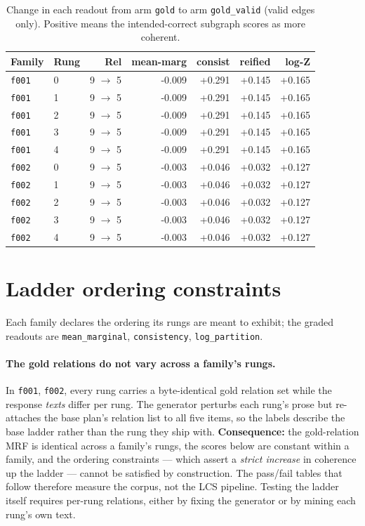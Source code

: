 \documentclass[11pt]{article}
\begin{document}
\begin{table}[htbp]
\centering
\small
\caption{Change in each readout from arm \texttt{gold} to arm \texttt{gold\_valid} (valid edges only). Positive means the intended-correct subgraph scores as more coherent.}
\label{tab:arm-delta}
\begin{tabular}{llrrrrr}
\toprule
Family & Rung & Rel & \textbf{mean-marg} & \textbf{consist} & \textbf{reified} & \textbf{log-Z} \\
\midrule
\texttt{f001} & 0 & 9 $\to$ 5 & -0.009 & +0.291 & +0.145 & +0.165 \\
\texttt{f001} & 1 & 9 $\to$ 5 & -0.009 & +0.291 & +0.145 & +0.165 \\
\texttt{f001} & 2 & 9 $\to$ 5 & -0.009 & +0.291 & +0.145 & +0.165 \\
\texttt{f001} & 3 & 9 $\to$ 5 & -0.009 & +0.291 & +0.145 & +0.165 \\
\texttt{f001} & 4 & 9 $\to$ 5 & -0.009 & +0.291 & +0.145 & +0.165 \\
\texttt{f002} & 0 & 9 $\to$ 5 & -0.003 & +0.046 & +0.032 & +0.127 \\
\texttt{f002} & 1 & 9 $\to$ 5 & -0.003 & +0.046 & +0.032 & +0.127 \\
\texttt{f002} & 2 & 9 $\to$ 5 & -0.003 & +0.046 & +0.032 & +0.127 \\
\texttt{f002} & 3 & 9 $\to$ 5 & -0.003 & +0.046 & +0.032 & +0.127 \\
\texttt{f002} & 4 & 9 $\to$ 5 & -0.003 & +0.046 & +0.032 & +0.127 \\
\bottomrule
\end{tabular}
\end{table}

\section{Ladder ordering constraints}\label{sec:ladder}

Each family declares the ordering its rungs are meant to exhibit; the graded readouts are \texttt{mean\_marginal}, \texttt{consistency}, \texttt{log\_partition}.

\paragraph{The gold relations do not vary across a family's rungs.} In \texttt{f001}, \texttt{f002}, every rung carries a byte-identical gold relation set while the response \emph{texts} differ per rung. The generator perturbs each rung's prose but re-attaches the base plan's relation list to all five items, so the labels describe the base ladder rather than the rung they ship with. \textbf{Consequence:} the gold-relation MRF is identical across a family's rungs, the scores below are constant within a family, and the ordering constraints --- which assert a \emph{strict increase} in coherence up the ladder --- cannot be satisfied by construction. The pass/fail tables that follow therefore measure the corpus, not the LCS pipeline. Testing the ladder itself requires per-rung relations, either by fixing the generator or by mining each rung's own text.
\end{document}
